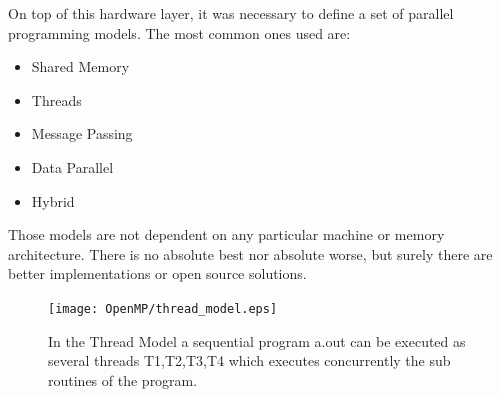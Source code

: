 \begin{figure}[htbp]
  \begin{center}
      \hspace{1pt}
    \caption[SISD architecture]{ \label{fig:Parallel:MIMD}}
  \end{center}
\end{figure}

On top of this hardware layer, it was necessary to define a set of parallel
programming models.
The most common ones used are:
\begin{itemize}
 \item Shared Memory
 \item Threads
 \item Message Passing
 \item Data Parallel
 \item Hybrid
\end{itemize}
Those models are not dependent on any particular machine or memory architecture.
There is no absolute best nor absolute worse, but surely there are
better implementations or open source solutions.

\begin{figure}[htbp]
\begin{center}
\texttt{[image: OpenMP/thread\_model.eps]}
\end{center}
\small{
\caption[The Thread model]{
In the Thread Model a sequential program a.out can be executed as several threads
T1,T2,T3,T4 which executes concurrently the sub routines of the program.
\label{Fig:Parallel:threadModel}}}
\end{figure}

